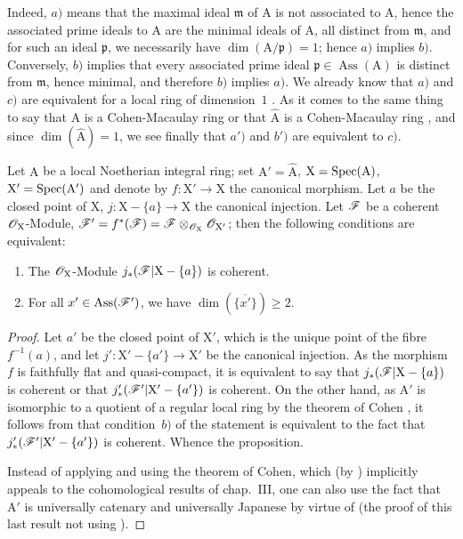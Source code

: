 
Indeed, $a)$ means that the maximal ideal $\mathfrak{m}$ of $\mathrm{A}$ is not associated to $\mathrm{A}$, hence the associated prime ideals to $\mathrm{A}$ are the minimal ideals of $\mathrm{A}$, all distinct from $\mathfrak{m}$, and for such an ideal $\mathfrak{p}$, we necessarily have $\dim(\mathrm{A}/\mathfrak{p})=1$; hence $a)$ implies $b)$.
Conversely, $b)$ implies that every associated prime ideal $\mathfrak{p}\in\operatorname{Ass}(\mathrm{A})$ is distinct from $\mathfrak{m}$, hence minimal, and therefore $b)$ implies $a)$.
We already know that $a)$ and $c)$ are equivalent for a local ring of dimension~$1$ .
As it comes to the same thing to say that $\mathrm{A}$ is a Cohen-Macaulay ring or that $\widehat{\mathrm{A}}$ is a Cohen-Macaulay ring , and since $\dim(\widehat{\mathrm{A}})=1$, we see finally that $a')$ and $b')$ are equivalent to $c)$.

\begin{proposition}[7.2.2]
\label{IV.7.2.2}
Let $\mathrm{A}$ be a local Noetherian integral ring; set $\mathrm{A}'=\widehat{\mathrm{A}}$, $\mathrm{X}=\operatorname{Spec}(\mathrm{A})$, $\mathrm{X}'=\operatorname{Spec}(\mathrm{A}')$ and denote by $f:\mathrm{X}'\to\mathrm{X}$ the canonical morphism.
Let $a$ be the closed point of $\mathrm{X}$, $j:\mathrm{X}-\{a\}\to\mathrm{X}$ the canonical injection.
Let $\mathscr{F}$ be a coherent $\mathscr{O}_\mathrm{X}$-Module, $\mathscr{F}'=f^*(\mathscr{F})=\mathscr{F}\otimes_{\mathscr{O}_\mathrm{X}}\mathscr{O}_{\mathrm{X}'}$; then the following conditions are equivalent:
\begin{enumerate}[label=\emph{\alph*)}]
  \item The $\mathscr{O}_\mathrm{X}$-Module $j_*(\mathscr{F}|\mathrm{X}-\{a\})$ is coherent.
  \item For all $x'\in\operatorname{Ass}(\mathscr{F}')$, we have $\dim(\overline{\{x'\}})\geqslant 2$.
\end{enumerate}
\end{proposition}

\begin{proof}
Let $a'$ be the closed point of $\mathrm{X}'$, which is the unique point of the fibre $f^{-1}(a)$, and let $j':\mathrm{X}'-\{a'\}\to\mathrm{X}'$ be the canonical injection.
As the morphism $f$ is faithfully flat and quasi-compact, it is equivalent to say that $j_*(\mathscr{F}|\mathrm{X}-\{a\})$ is coherent or that $j'_*(\mathscr{F}'|\mathrm{X}'-\{a'\})$ is coherent.
On the other hand, as $\mathrm{A}'$ is isomorphic to a quotient of a regular local ring by the theorem of Cohen , it follows from  that condition~$b)$ of the statement is equivalent to the fact that $j'_*(\mathscr{F}'|\mathrm{X}'-\{a'\})$ is coherent.
Whence the proposition.

Instead of applying  and using the theorem of Cohen, which (by ) implicitly appeals to the cohomological results of chap.~III, one can also use the fact that $\mathrm{A}'$ is universally catenary  and universally Japanese by virtue of  (the proof of this last result not using ).
\end{proof}

